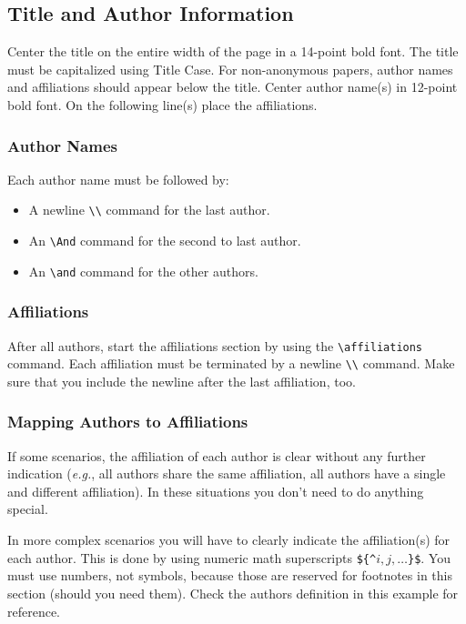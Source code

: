 \documentclass{article}
\begin{document}
\subsection{Title and Author Information}

Center the title on the entire width of the page in a 14-point bold
font. The title must be capitalized using Title Case. For non-anonymous papers, author names and affiliations should appear below the title. Center author name(s) in 12-point bold font. On the following line(s) place the affiliations.

\subsubsection{Author Names}

Each author name must be followed by:
\begin{itemize}
    \item A newline {\tt \textbackslash{}\textbackslash{}} command for the last author.
    \item An {\tt \textbackslash{}And} command for the second to last author.
    \item An {\tt \textbackslash{}and} command for the other authors.
\end{itemize}

\subsubsection{Affiliations}

After all authors, start the affiliations section by using the {\tt \textbackslash{}affiliations} command.
Each affiliation must be terminated by a newline {\tt \textbackslash{}\textbackslash{}} command. Make sure that you include the newline after the last affiliation, too.

\subsubsection{Mapping Authors to Affiliations}

If some scenarios, the affiliation of each author is clear without any further indication (\emph{e.g.}, all authors share the same affiliation, all authors have a single and different affiliation). In these situations you don't need to do anything special.

In more complex scenarios you will have to clearly indicate the affiliation(s) for each author. This is done by using numeric math superscripts {\tt \$\{\^{}$i,j, \ldots$\}\$}. You must use numbers, not symbols, because those are reserved for footnotes in this section (should you need them). Check the authors definition in this example for reference.
\end{document}
